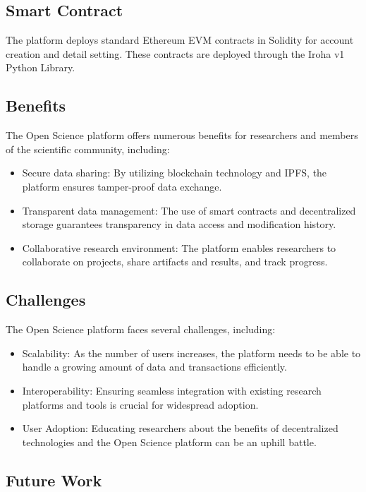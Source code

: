 \documentclass{article}
\begin{document}
\subsection{Smart Contract}

The platform deploys standard Ethereum EVM contracts in Solidity for account creation and detail setting. These contracts are deployed through the Iroha v1 Python Library.

\subsection{Benefits}

The Open Science platform offers numerous benefits for researchers and members of the scientific community, including:

\begin{itemize}
    \item Secure data sharing: By utilizing blockchain technology and IPFS, the platform ensures tamper-proof data exchange.
    \item Transparent data management: The use of smart contracts and decentralized storage guarantees transparency in data access and modification history.
    \item Collaborative research environment: The platform enables researchers to collaborate on projects, share artifacts and results, and track progress.
\end{itemize}

\subsection{Challenges}

The Open Science platform faces several challenges, including:

\begin{itemize}
    \item Scalability: As the number of users increases, the platform needs to be able to handle a growing amount of data and transactions efficiently.
    \item Interoperability: Ensuring seamless integration with existing research platforms and tools is crucial for widespread adoption.
    \item User Adoption: Educating researchers about the benefits of decentralized technologies and the Open Science platform can be an uphill battle.
\end{itemize}

\subsection{Future Work}
\end{document}
